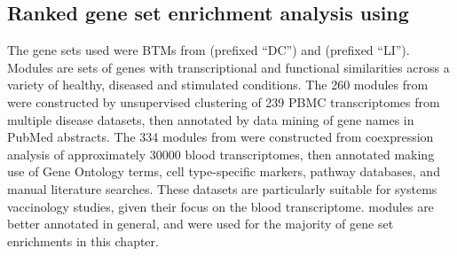 \subsection{Ranked gene set enrichment analysis using }
\label{subsec:hird_dge_geneSetEnrichment}


The gene sets used were \glspl{BTM} from \textcite{chaussabel2008ModularAnalysisFramework} (prefixed \enquote{DC}) and \textcite{li2013MolecularSignaturesAntibody} (prefixed \enquote{LI}).
Modules are sets of genes with transcriptional and functional similarities across a variety of healthy, diseased and stimulated conditions.
The 260 modules from \textcite{chaussabel2008ModularAnalysisFramework} were constructed by unsupervised clustering of 239 \gls{PBMC} transcriptomes from multiple disease datasets,
then annotated by data mining of gene names in PubMed abstracts.
The 334 modules from \textcite{li2013MolecularSignaturesAntibody} were constructed from coexpression analysis of approximately \num{30000} blood transcriptomes,
then annotated making use of Gene Ontology terms, cell type-specific markers, pathway databases, and manual literature searches.
These datasets are particularly suitable for systems vaccinology studies, given their focus on the blood transcriptome.
\textcite{li2013MolecularSignaturesAntibody} modules are better annotated in general, and were used for the majority of gene set enrichments in this chapter.

